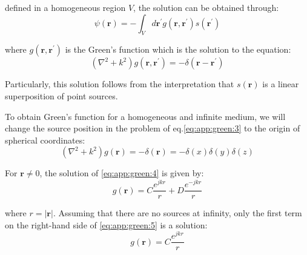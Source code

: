 			\noindent defined in a homogeneous region $V$, the solution can be obtained through:
			\begin{equation}
				\psi(\mathbf{r}) = - \int_V d\mathbf{r^\prime} g(\mathbf{r}, \mathbf{r^\prime})s(\mathbf{r^\prime}) \label{eq:app:green:2}
			\end{equation}

			\noindent where $g(\mathbf{r}, \mathbf{r^\prime})$ is the Green's function which is the solution to the equation:
			\begin{equation}
					(\nabla^2+k^2)g(\mathbf{r},\mathbf{r^\prime}) = -\delta(\mathbf{r}-\mathbf{r^\prime}) \label{eq:app:green:3}
			\end{equation}
	
			Particularly, this solution follows from the interpretation that $s(\mathbf{r})$ is a linear superposition of point sources.

			To obtain Green's function for a homogeneous and infinite medium, we will change the source position in the problem of eq.\eqref{eq:app:green:3} to the origin of spherical coordinates:
			\begin{equation}
				(\nabla^2+k^2)g(\mathbf{r}) = -\delta(\mathbf{r}) = -\delta(x)\delta(y)\delta(z) \label{eq:app:green:4}
			\end{equation}
		
			For $\mathbf{r}\neq0$, the solution of \eqref{eq:app:green:4} is given by:
			\begin{equation}
				g(\mathbf{r}) = C\frac{e^{jkr}}{r} + D\frac{e^{-jkr}}{r} \label{eq:app:green:5}
				\end{equation}
   
   			\noindent where $r = |\mathbf{r}|$. Assuming that there are no sources at infinity, only the first term on the right-hand side of \eqref{eq:app:green:5} is a solution:
   			\begin{equation}
   				g(\mathbf{r}) = C\frac{e^{jkr}}{r} \label{eq:app:green:6}
   			\end{equation}

